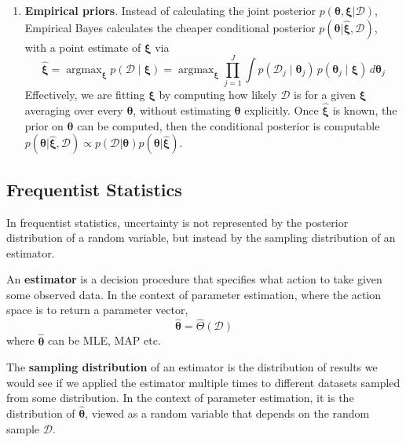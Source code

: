 \documentclass[11pt]{article}
\begin{document}
\begin{enumerate}
    \item \textbf{Empirical priors}. Instead of calculating the joint posterior $p(\boldsymbol{\theta}, \boldsymbol{\xi} | \mathcal{D})$, Empirical Bayes calculates the cheaper conditional posterior $p( \boldsymbol{\theta} | \hat{\boldsymbol{\xi}}, \mathcal{D})$, with a point estimate of $\boldsymbol{\xi}$ via
    \[
    \hat{\boldsymbol{\xi}} = \mathop{\mathrm{argmax}}_{\boldsymbol{\xi}} p(\mathcal{D} \mid \boldsymbol{\xi}) = \mathop{\mathrm{argmax}}_{\boldsymbol{\xi}} \prod_{j=1}^J \int p(\mathcal{D}_j \mid \boldsymbol{\theta}_j)\, p(\boldsymbol{\theta}_j \mid \boldsymbol{\xi})\, d\boldsymbol{\theta}_j
    \]
    Effectively, we are fitting $\boldsymbol{\xi}$ by computing how likely $\mathcal{D}$ is for a given $\boldsymbol{\xi}$ averaging over every $\boldsymbol{\theta}$, without estimating $\boldsymbol{\theta}$ explicitly.
    Once $\hat{\boldsymbol{\xi}}$ is known, the prior on $\boldsymbol{\theta}$ can be computed, then the conditional posterior is computable $p( \boldsymbol{\theta} | \hat{\boldsymbol{\xi}}, \mathcal{D}) \propto p(\mathcal{D} | \boldsymbol{\theta})p(\boldsymbol{\theta}|\hat{\boldsymbol{\xi}})$.
\end{enumerate}

\subsection{Frequentist Statistics}
In frequentist statistics, uncertainty is not represented by the posterior distribution of a random variable, but instead by the sampling distribution of an estimator.

An \textbf{estimator} is a decision procedure that specifies what action to take given some observed data. 
In the context of parameter estimation, where the action space is to return a parameter vector,
\[
\hat{\boldsymbol{\theta}} = \hat{\Theta}(\mathcal{D})
\]
where $\hat{\boldsymbol{\theta}}$ can be MLE, MAP etc.

The \textbf{sampling distribution} of an estimator is the distribution of results we would see if we applied the estimator multiple times to different datasets sampled from some distribution.
In the context of parameter estimation, it is the distribution of $\hat{\boldsymbol{\theta}}$, viewed as a random variable that depends on the random sample $\mathcal{D}$.
\end{document}

